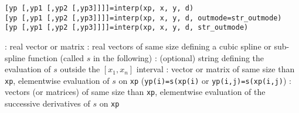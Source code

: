 
\begin{mandesc}
\end{mandesc}

\begin{calling_sequence}
    \begin{verbatim}
[yp [,yp1 [,yp2 [,yp3]]]]=interp(xp, x, y, d)
[yp [,yp1 [,yp2 [,yp3]]]]=interp(xp, x, y, d, outmode=str_outmode)
[yp [,yp1 [,yp2 [,yp3]]]]=interp(xp, x, y, d, str_outmode)
    \end{verbatim}
\end{calling_sequence}

\begin{parameters}
  \begin{varlist}
   : real vector or matrix
   : real vectors of same size defining a cubic spline or sub-spline function 
                (called $s$ in the following)
   : (optional) string defining the evaluation of $s$ outside the $[x_1,x_n]$ interval
   : vector or matrix of same size than \verb!xp!, elementwise evaluation of $s$
                on \verb!xp! (\verb!yp(i)=s(xp(i)! or \verb!yp(i,j)=s(xp(i,j)!)
   : vectors (or matrices) of same size than \verb!xp!, elementwise evaluation of the 
                successive derivatives of $s$ on \verb!xp!
  \end{varlist}
\end{parameters}

